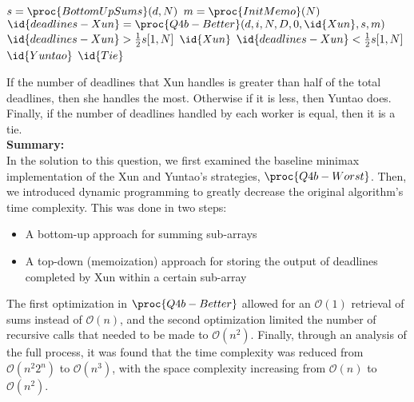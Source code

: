 \begin{spacing}{1.2}
    \begin{codebox}
        \li $s = \proc{BottomUpSums}(d, N)$
        \li $m = \proc{InitMemo}(N)$
        \li $\id{deadlines-Xun} = \proc{Q4b-Better}(d, i, N, D, 0, \id{Xun}, s, m)$
        \li \If $\id{deadlines-Xun} > {1 \over 2}s[1, N]$
        \Then
        \li \Return $\id{Xun}$
        \li \ElseIf $\id{deadlines-Xun} < {1 \over 2}s[1, N]$
        \Then
        \li \Return $\id{Yuntao}$
        \li \Else
        \li \Return $\id{Tie}$
        \End
    \end{codebox}
\end{spacing}
\vspace{5mm}
If the number of deadlines that Xun handles is greater than half of the total deadlines, then she handles the most.
Otherwise if it is less, then Yuntao does.
Finally, if the number of deadlines handled by each worker is equal, then it is a tie.\\

\textbf{Summary:}\\
In the solution to this question, we first examined the baseline minimax implementation of the Xun and Yuntao's strategies, $\proc{Q4b-Worst}$.
Then, we introduced dynamic programming to greatly decrease the original algorithm's time complexity.
This was done in two steps:
\begin{spacing}{1}
    \begin{itemize}
        \item A bottom-up approach for summing sub-arrays
        \item A top-down (memoization) approach for storing the output of deadlines completed by Xun within a certain sub-array
    \end{itemize}
\end{spacing}

The first optimization in $\proc{Q4b-Better}$ allowed for an $\mathcal{O}(1)$ retrieval of sums instead of $\mathcal{O}(n)$, and the second optimization limited the number of recursive calls that needed to be made to $\mathcal{O}(n^2)$.
Finally, through an analysis of the full process, it was found that the time complexity was reduced from $\mathcal{O}({n^2}{2^n})$ to $\mathcal{O}(n^3)$, with the space complexity increasing from $\mathcal{O}(n)$ to $\mathcal{O}(n^2)$.